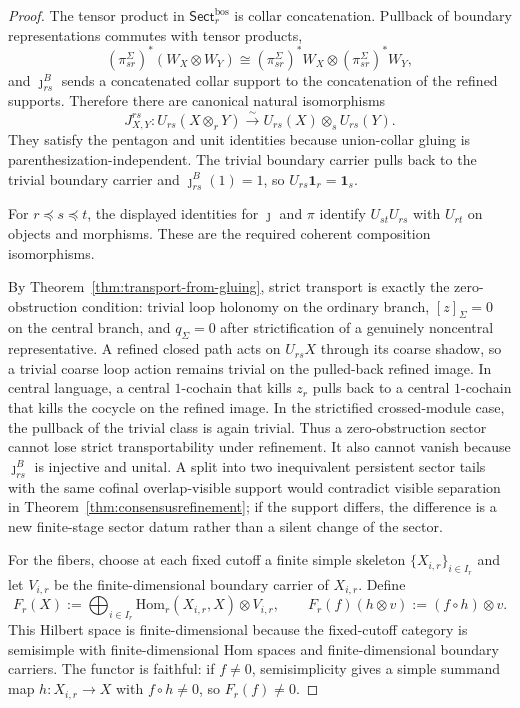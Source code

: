 \documentclass[11pt]{article}
\begin{document}
\begin{proof}
The tensor product in \(\mathsf{Sect}^{\mathrm{bos}}_r\) is collar concatenation. Pullback of
boundary representations commutes with tensor products,
\[
(\pi_{sr}^{\Sigma})^\ast(W_X\otimes W_Y)
\cong
(\pi_{sr}^{\Sigma})^\ast W_X\otimes(\pi_{sr}^{\Sigma})^\ast W_Y,
\]
and \(\jmath_{rs}^{B}\) sends a concatenated collar support to the concatenation of the refined
supports. Therefore there are canonical natural isomorphisms
\[
J^{rs}_{X,Y}:U_{rs}(X\otimes_r Y)\xrightarrow{\sim}U_{rs}(X)\otimes_s U_{rs}(Y).
\]
They satisfy the pentagon and unit identities because union-collar gluing is
parenthesization-independent. The trivial boundary carrier pulls back to the trivial boundary
carrier and \(\jmath_{rs}^{B}(1)=1\), so \(U_{rs}\mathbf 1_r=\mathbf 1_s\).

For \(r\preceq s\preceq t\), the displayed identities for \(\jmath\) and \(\pi\) identify
\(U_{st}U_{rs}\) with \(U_{rt}\) on objects and morphisms. These are the required coherent
composition isomorphisms.

By Theorem~\ref{thm:transport-from-gluing}, strict transport is exactly the zero-obstruction
condition: trivial loop holonomy on the ordinary branch, \([z]_\Sigma=0\) on the central branch,
and \(q_\Sigma=0\) after strictification of a genuinely noncentral representative. A refined
closed path acts on \(U_{rs}X\) through its coarse shadow, so a trivial coarse loop action remains
trivial on the pulled-back refined image. In central language, a central \(1\)-cochain that kills
\(z_r\) pulls back to a central \(1\)-cochain that kills the cocycle on the refined image. In the
strictified crossed-module case, the pullback of the trivial class is again trivial. Thus a
zero-obstruction sector cannot lose strict transportability under refinement. It also cannot vanish
because \(\jmath_{rs}^{B}\) is injective and unital. A split into two inequivalent persistent
sector tails with the same cofinal overlap-visible support would contradict visible separation in
Theorem~\ref{thm:consensusrefinement}; if the support differs, the difference is a new finite-stage
sector datum rather than a silent change of the sector.

For the fibers, choose at each fixed cutoff a finite simple skeleton \(\{X_{i,r}\}_{i\in I_r}\) and
let \(V_{i,r}\) be the finite-dimensional boundary carrier of \(X_{i,r}\). Define
\[
F_r(X)
:=
\bigoplus_{i\in I_r}\mathrm{Hom}_r(X_{i,r},X)\otimes V_{i,r},
\qquad
F_r(f)(h\otimes v):=(f\circ h)\otimes v.
\]
This Hilbert space is finite-dimensional because the fixed-cutoff category is semisimple with
finite-dimensional Hom spaces and finite-dimensional boundary carriers. The functor is faithful:
if \(f\ne0\), semisimplicity gives a simple summand map \(h:X_{i,r}\to X\) with \(f\circ h\ne0\),
so \(F_r(f)\ne0\).


\end{proof}
\end{document}
